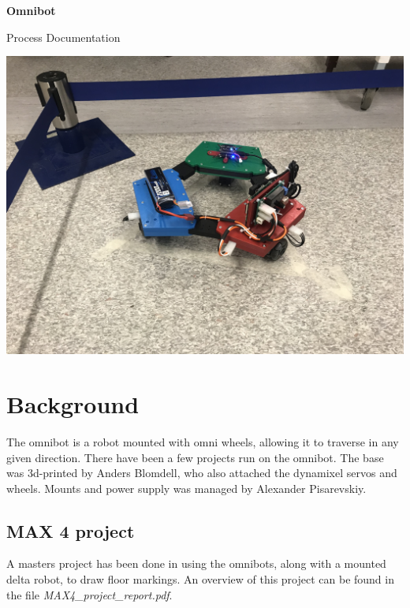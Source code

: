 \documentclass[10pt,a4paper]{article}
\begin{document}
	\begin{titlepage}
		\begin{center}
			\vspace*{1cm}
			
			\Huge{\textbf{Omnibot}}
			
			\vspace{0.5cm}
			Process Documentation
			
			
			\vfill
			
			
			
			\includegraphics[width=\textwidth]{figs/bot.jpg}
			\vspace{0.8cm}
			
		\end{center}
	\end{titlepage}
	
	\section{Background}
	The omnibot is a robot mounted with omni wheels, allowing it to traverse in any given direction. There have been a few projects run on the omnibot. The base was 3d-printed by Anders Blomdell, who also attached the dynamixel servos and wheels. Mounts and power supply was managed by Alexander Pisarevskiy.
	
	\subsection{MAX 4 project}
	A masters project has been done in using the omnibots, along with a mounted delta robot, to draw floor markings. An overview of this project can be found in the file \textit{MAX4\_project\_report.pdf}.
	
\end{document}

